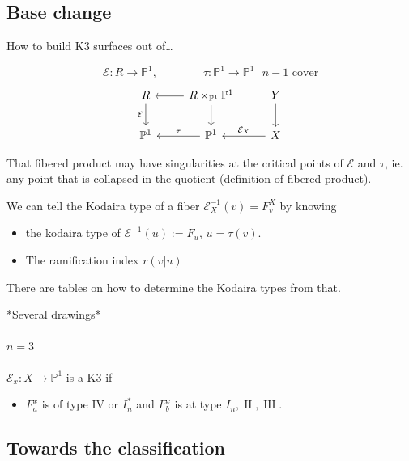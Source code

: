 \subsection{Base change}

How to build K3 surfaces out of…

\[\mathcal{E}:R\to \mathbb{P}^1,\qquad \qquad \tau :\mathbb{P}^1\to \mathbb{P}^1 \text{ $n-1$ cover} \]
\[\begin{tikzcd}
	R\arrow[d,"\mathcal{E}",swap]& R\times_{\mathbb{P}^1}\mathbb{P}^1\arrow[l]\arrow[d]& Y\arrow[d]\\
	\mathbb{P}^1&\mathbb{P}^1\arrow[l,"\tau ",swap]& X\arrow[l,swap,"\mathcal{E}_X"]
\end{tikzcd}\]

\begin{remark}[Sergey]\leavevmode
	That fibered product may have singularities at the critical points of $\mathcal{E}$ and $\tau$, ie. any point that is collapsed in the quotient (definition of fibered product).
\end{remark}

	We can tell the Kodaira type of a fiber $\mathcal{E}^{-1}_X(v)=F^X_v$ by knowing
	\begin{itemize}
	\item the kodaira type of $\mathcal{E}^{-1}(u):=F_u$, $u=\tau(v)$.
	\item The ramification index $r(v|u)$
	\end{itemize}

	There are tables on how to determine the Kodaira types from that.

*Several drawings*

\paragraph{$n=3$} $\mathcal{E}_{x}:X\to \mathbb{P}^1$ is a K3 if
\begin{itemize}
\item $F_a^x$ is of type IV or $I^*_n$ and $F^x_b$ is at type $I_n, \operatorname{I I},\operatorname{I I I }$.
\end{itemize}

\subsection{Towards the classification}

